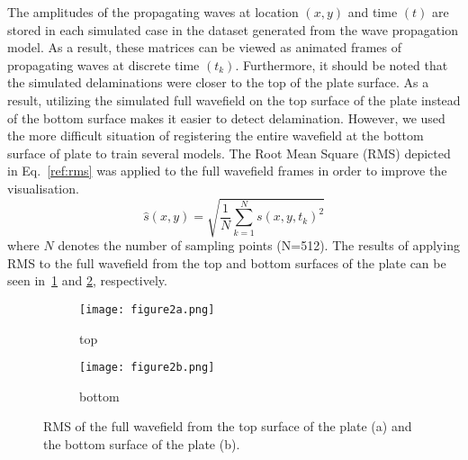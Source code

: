 The amplitudes of the propagating waves at location \((x,y)\) and time \((t)\) are stored in each simulated case in the dataset generated from the wave propagation model.
As a result, these matrices can be viewed as animated frames of propagating waves at discrete time \((t_k)\).
Furthermore, it should be noted that the simulated delaminations were closer to the top of the plate surface.
As a result, utilizing the simulated full wavefield on the top surface of the plate instead of the bottom surface makes it easier to detect delamination.
However, we used the more difficult situation of registering the entire wavefield at the bottom surface of plate to train several models.
The Root Mean Square (RMS) depicted in Eq.~\ref{ref:rms} was applied to the full wavefield frames in order to improve the visualisation.
\begin{equation}
	\hat{s}(x,y) = \sqrt{\frac{1}{N}\sum_{k=1}^{N} s(x,y,t_k)^2}
	\label{ref:rms}
\end{equation}
where \(N\) denotes the number of sampling points (N=512).
The results of applying RMS to the full wavefield from the top and bottom surfaces of the plate can be seen in~\ref{fig:rmstop} and \ref{fig:rmsbottom}, respectively.
\begin{figure}[!h]
	\centering
	\begin{subfigure}[b]{0.49\textwidth}		
		\centering
		\texttt{[image: figure2a.png]}
		\caption{top}
		\label{fig:rmstop}
	\end{subfigure}
	\hfill
	\begin{subfigure}[b]{0.49\textwidth}		
		\centering
		\texttt{[image: figure2b.png]}
		\caption{bottom}
		\label{fig:rmsbottom}
	\end{subfigure}
	\caption{RMS of the full wavefield from the top surface of the plate (a) and the bottom surface of the plate (b).}
	\label{fig:rms}
\end{figure} 
